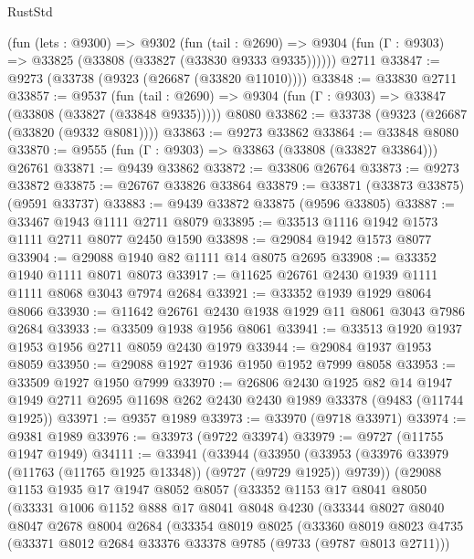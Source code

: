 \begin{lexlean}{RustStd}
\begin{coremodule}
    (fun (lets : @9300) =>
    @9302
      (fun (tail : @2690) =>
      @9304 (fun (Γ : @9303) => @33825 (@33808 (@33827 (@33830 @9333 @9335))))))
    @2711
@33847 := @9273 (@33738 (@9323 (@26687 (@33820 @11010))))
@33848 := @33830 @2711
@33857 := @9537
    (fun (tail : @2690) => @9304 (fun (Γ : @9303) => @33847 (@33808 (@33827 (@33848 @9335)))))
    @8080
@33862 := @33738 (@9323 (@26687 (@33820 (@9332 @8081))))
@33863 := @9273 @33862
@33864 := @33848 @8080
@33870 := @9555 (fun (Γ : @9303) => @33863 (@33808 (@33827 @33864))) @26761
@33871 := @9439 @33862
@33872 := @33806 @26764
@33873 := @9273 @33872
@33875 := @26767 @33826 @33864
@33879 := @33871 (@33873 @33875) (@9591 @33737)
@33883 := @9439 @33872 @33875 (@9596 @33805)
@33887 := @33467 @1943 @1111 @2711 @8079
@33895 := @33513 @1116 @1942 @1573 @1111 @2711 @8077 @2450 @1590
@33898 := @29084 @1942 @1573 @8077
@33904 := @29088 @1940 @82 @1111 @14 @8075 @2695
@33908 := @33352 @1940 @1111 @8071 @8073
@33917 := @11625 @26761 @2430 @1939 @1111 @1111 @8068 @3043 @7974 @2684
@33921 := @33352 @1939 @1929 @8064 @8066
@33930 := @11642 @26761 @2430 @1938 @1929 @11 @8061 @3043 @7986 @2684
@33933 := @33509 @1938 @1956 @8061
@33941 := @33513 @1920 @1937 @1953 @1956 @2711 @8059 @2430 @1979
@33944 := @29084 @1937 @1953 @8059
@33950 := @29088 @1927 @1936 @1950 @1952 @7999 @8058
@33953 := @33509 @1927 @1950 @7999
@33970 := @26806
    @2430
    @1925
    @82
    @14
    @1947
    @1949
    @2711
    @2695
    @11698
    @262
    @2430
    @2430
    @1989
    @33378
    (@9483 (@11744 @1925))
@33971 := @9357 @1989
@33973 := @33970 (@9718 @33971)
@33974 := @9381 @1989
@33976 := @33973 (@9722 @33974)
@33979 := @9727 (@11755 @1947 @1949)
@34111 := @33941
    (@33944
      (@33950
        (@33953 (@33976 @33979 (@11763 (@11765 @1925 @13348)) (@9727 (@9729 @1925)) @9739))
        (@29088
          @1153
          @1935
          @17
          @1947
          @8052
          @8057
          (@33352
            @1153
            @17
            @8041
            @8050
            (@33331
              @1006
              @1152
              @888
              @17
              @8041
              @8048
              @4230
              (@33344
                @8027
                @8040
                @8047
                @2678
                @8004
                @2684
                (@33354
                  @8019
                  @8025
                  (@33360
                    @8019
                    @8023
                    @4735
                    (@33371 @8012 @2684 @33376 @33378 @9785 (@9733 (@9787 @8013 @2711)))

\end{coremodule}
\end{lexlean}
